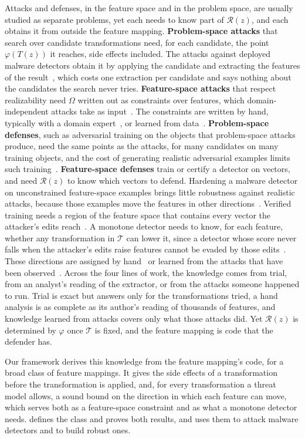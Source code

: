 Attacks and defenses, in the feature space and in the problem space, are usually studied as separate problems, yet each
needs to know part of $\mathcal{R}(z)$, and each obtains it from outside the feature mapping. \textbf{Problem-space
attacks} that search over candidate transformations need, for each candidate, the point $\varphi(T(z))$ it reaches, side
effects included. The attacks against deployed malware detectors obtain it by applying the candidate and extracting the
features of the result~\cite{demetrio2021functionality,song2022mab}, which costs one extraction per candidate and says
nothing about the candidates the search never tries. \textbf{Feature-space attacks} that respect realizability need
$\Omega$ written out as constraints over features, which domain-independent attacks take as
input~\cite{simonetto2022unified,chernikova2022fence}. The constraints are written by hand, typically with a domain
expert~\cite{dyrmishi2023empirical}, or learned from data~\cite{sheatsley2021robustness}. \textbf{Problem-space
defenses}, such as adversarial training on the objects that problem-space attacks produce, need the same points as the
attacks, for many candidates on many training objects, and the cost of generating realistic adversarial examples limits
such training~\cite{dyrmishi2023empirical,lucas2023adversarial}. \textbf{Feature-space defenses} train or certify a
detector on vectors, and need $\mathcal{R}(z)$ to know which vectors to defend. Hardening a malware detector on
unconstrained feature-space examples brings little robustness against realistic attacks, because those examples move the
features in other directions~\cite{dyrmishi2023empirical}. Verified training needs a region of the feature space that
contains every vector the attacker's edits reach~\cite{chen2020training}. A monotone detector needs to know, for each
feature, whether any transformation in $\mathcal{T}$ can lower it, since a detector whose score never falls when the
attacker's edits raise features cannot be evaded by those edits~\cite{incer2018adversarially,gimenez2025certifiably}.
These directions are assigned by hand~\cite{incer2018adversarially,gimenez2025certifiably} or learned from the attacks
that have been observed~\cite{gimenez2025certifiably}. Across the four lines of work, the knowledge comes from trial,
from an analyst's reading of the extractor, or from the attacks someone happened to run. Trial is exact but answers only
for the transformations tried, a hand analysis is as complete as its author's reading of thousands of features, and
knowledge learned from attacks covers only what those attacks did. Yet $\mathcal{R}(z)$ is determined by $\varphi$ once
$\mathcal{T}$ is fixed, and the feature mapping is code that the defender has.

Our framework derives this knowledge from the feature mapping's code, for a broad class of feature mappings. It gives
the side effects of a transformation before the transformation is applied, and, for every transformation a threat
model allows, a sound bound on the direction in which each feature can move, which serves both as a feature-space
constraint and as what a monotone detector needs.  defines the class and proves both results, and
 uses them to attack malware detectors and to build robust ones.
